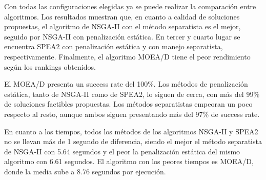 Con todas las configuraciones elegidas ya se puede realizar la comparación entre algoritmos. Los resultados muestran que, en cuanto a calidad de soluciones propuestas, el algoritmo de NSGA-II con el método separatista es el mejor, seguido por NSGA-II con penalización estática. En tercer y cuarto lugar se encuentra SPEA2 con penalización estática y con manejo separatista, respectivamente. Finalmente, el algoritmo MOEA/D tiene el peor rendimiento según los rankings obtenidos.

El MOEA/D presenta un success rate del 100\%. Los métodos de penalización estática, tanto de NSGA-II como de SPEA2, lo siguen de cerca, con más del 99\% de soluciones factibles propuestas. Los métodos separatistas empeoran un poco respecto al resto, aunque ambos siguen presentando más del 97\% de success rate.

En cuanto a los tiempos, todos los métodos de los algoritmos NSGA-II y SPEA2 no se llevan más de 1 segundo de diferencia, siendo el mejor el método separatista de NSGA-II con 5.64 segundos y el peor la penalización estática del mismo algoritmo con 6.61 segundos. El algoritmo con los peores tiempos es MOEA/D, donde la media sube a 8.76 segundos por ejecución.

\renewcommand{\arraystretch}{1.5}


